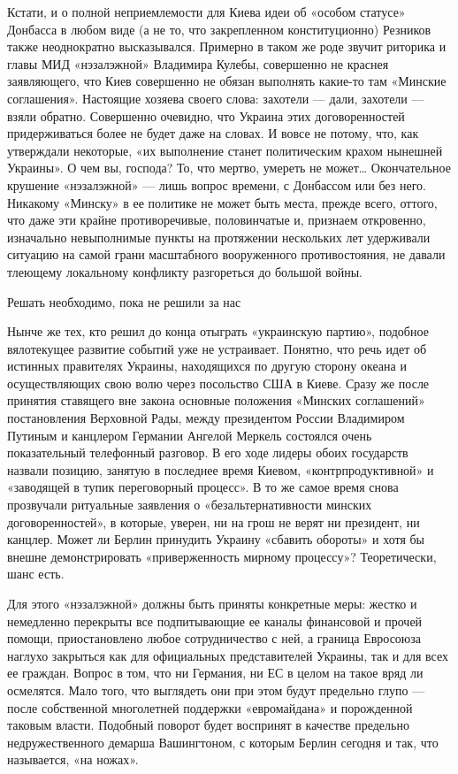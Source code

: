Кстати, и о полной неприемлемости для Киева идеи об «особом статусе» Донбасса в любом виде (а не то, что закрепленном конституционно) Резников также неоднократно высказывался. Примерно в таком же роде звучит риторика и главы МИД «нэзалэжной» Владимира Кулебы, совершенно не краснея заявляющего, что Киев совершенно не обязан выполнять какие-то там «Минские соглашения». Настоящие хозяева своего слова: захотели --- дали, захотели --- взяли обратно. Совершенно очевидно, что Украина этих договоренностей придерживаться более не будет даже на словах. И вовсе не потому, что, как утверждали некоторые, «их выполнение станет политическим крахом нынешней Украины». О чем вы, господа? То, что мертво, умереть не может… Окончательное крушение «нэзалэжной» --- лишь вопрос времени, с Донбассом или без него. Никакому «Минску» в ее политике не может быть места, прежде всего, оттого, что даже эти крайне противоречивые, половинчатые и, признаем откровенно, изначально невыполнимые пункты на протяжении нескольких лет удерживали ситуацию на самой грани масштабного вооруженного противостояния, не давали тлеющему локальному конфликту разгореться до большой войны.

Решать необходимо, пока не решили за нас

Нынче же тех, кто решил до конца отыграть «украинскую партию», подобное
вялотекущее развитие событий уже не устраивает. Понятно, что речь идет об
истинных правителях Украины, находящихся по другую сторону океана и
осуществляющих свою волю через посольство США в Киеве. Сразу же после принятия
ставящего вне закона основные положения «Минских соглашений» постановления
Верховной Рады, между президентом России Владимиром Путиным и канцлером
Германии Ангелой Меркель состоялся очень показательный телефонный разговор. В
его ходе лидеры обоих государств назвали позицию, занятую в последнее время
Киевом, «контрпродуктивной» и «заводящей в тупик переговорный процесс». В то же
самое время снова прозвучали ритуальные заявления о «безальтернативности
минских договоренностей», в которые, уверен, ни на грош не верят ни президент,
ни канцлер. Может ли Берлин принудить Украину «сбавить обороты» и хотя бы
внешне демонстрировать «приверженность мирному процессу»? Теоретически, шанс
есть.

Для этого «нэзалэжной» должны быть приняты конкретные меры: жестко и немедленно
перекрыты все подпитывающие ее каналы финансовой и прочей помощи,
приостановлено любое сотрудничество с ней, а граница Евросоюза наглухо
закрыться как для официальных представителей Украины, так и для всех ее
граждан. Вопрос в том, что ни Германия, ни ЕС в целом на такое вряд ли
осмелятся. Мало того, что выглядеть они при этом будут предельно глупо --- после
собственной многолетней поддержки «евромайдана» и порожденной таковым власти.
Подобный поворот будет воспринят в качестве предельно недружественного демарша
Вашингтоном, с которым Берлин сегодня и так, что называется, «на ножах».

